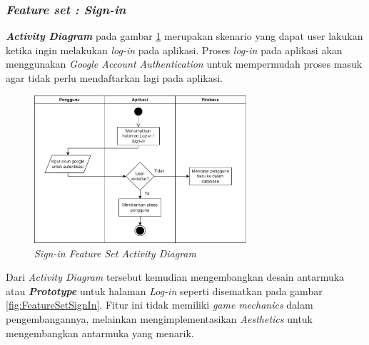 \subsubsection{\textit{Feature set : Sign-in}}
\textbf{\textit{Activity Diagram}} pada gambar \ref*{Fig:ActivityDiagramSignIn} merupakan skenario yang dapat user lakukan ketika ingin melakukan \textit{log-in} pada aplikasi.
Proses \textit{log-in} pada aplikasi akan menggunakan \textit{Google Account Authentication} untuk mempermudah proses masuk agar tidak perlu mendaftarkan lagi pada aplikasi.
\begin{figure}[H]
	\centering
	\includegraphics[width=0.7\textwidth]{contents/chapter-3/images/AD-signin.png}
	\caption[Caption]{\textit{Sign-in Feature Set Activity Diagram}}
	\label{Fig:ActivityDiagramSignIn}
\end{figure}
Dari \textit{Activity Diagram} tersebut kemudian mengembangkan desain antarmuka atau \textbf{\textit{Prototype}} untuk halaman \textit{Log-in} seperti disematkan pada gambar \ref*{fig:FeatureSetSignIn}.
Fitur ini tidak memiliki \textit{game mechanics} dalam pengembangannya, melainkan mengimplementasikan \textit{Aesthetics} untuk mengembangkan antarmuka yang menarik.
